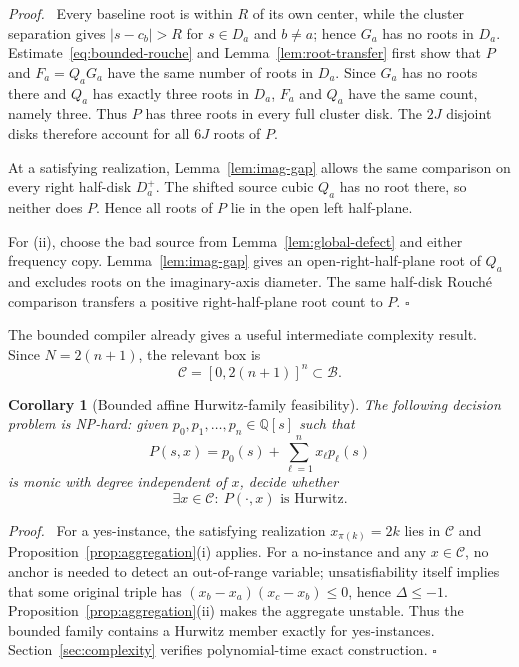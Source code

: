 \documentclass[final,5p,times,twocolumn]{elsarticle}
\newcommand{\Q}{\mathbb Q}
\newtheorem{corollary}[theorem]{Corollary}
\newenvironment{proof}[1][Proof]
  {\par\smallskip\noindent\textit{#1.}\ }
  {\hfill$\square$\par\smallskip}
\begin{document}
\begin{proof}
Every baseline root is within $R$ of its own center, while the cluster separation gives $|s-c_b|>R$ for $s\in D_a$ and $b\ne a$; hence $G_a$ has no roots in $D_a$. Estimate~\eqref{eq:bounded-rouche} and Lemma~\ref{lem:root-transfer} first show that $P$ and $F_a=Q_aG_a$ have the same number of roots in $D_a$. Since $G_a$ has no roots there and $Q_a$ has exactly three roots in $D_a$, $F_a$ and $Q_a$ have the same count, namely three. Thus $P$ has three roots in every full cluster disk. The $2J$ disjoint disks therefore account for all $6J$ roots of $P$.

At a satisfying realization, Lemma~\ref{lem:imag-gap} allows the same comparison on every right half-disk $D_a^+$. The shifted source cubic $Q_a$ has no root there, so neither does $P$. Hence all roots of $P$ lie in the open left half-plane.

For (ii), choose the bad source from Lemma~\ref{lem:global-defect} and either frequency copy. Lemma~\ref{lem:imag-gap} gives an open-right-half-plane root of $Q_a$ and excludes roots on the imaginary-axis diameter. The same half-disk Rouch\'e comparison transfers a positive right-half-plane root count to $P$.
\end{proof}

The bounded compiler already gives a useful intermediate complexity result. Since $N=2(n+1)$, the relevant box is
\[
\mathcal C=[0,2(n+1)]^n\subset\mathcal B.
\]

\begin{corollary}[Bounded affine Hurwitz-family feasibility]\label{cor:affine-hurwitz}
The following decision problem is NP-hard: given $p_0,p_1,\ldots,p_n\in\Q[s]$ such that
\[
P(s,x)=p_0(s)+\sum_{\ell=1}^n x_\ell p_\ell(s)
\]
is monic with degree independent of $x$, decide whether
\[
\exists x\in\mathcal C:\ P(\cdot,x)\text{ is Hurwitz}.
\]
\end{corollary}

\begin{proof}
For a yes-instance, the satisfying realization $x_{\pi(k)}=2k$ lies in $\mathcal C$ and Proposition~\ref{prop:aggregation}(i) applies. For a no-instance and any $x\in\mathcal C$, no anchor is needed to detect an out-of-range variable; unsatisfiability itself implies that some original triple has $(x_b-x_a)(x_c-x_b)\le0$, hence $\Delta\le-1$. Proposition~\ref{prop:aggregation}(ii) makes the aggregate unstable. Thus the bounded family contains a Hurwitz member exactly for yes-instances. Section~\ref{sec:complexity} verifies polynomial-time exact construction.
\end{proof}
\end{document}
